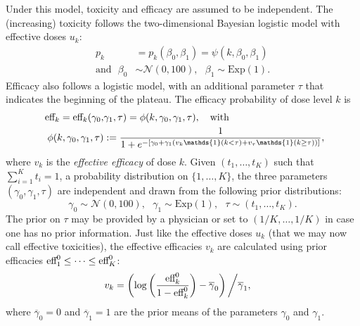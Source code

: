 Under this model, toxicity and efficacy are assumed to be independent. The (increasing) toxicity follows the two-dimensional Bayesian logistic model with effective doses $u_k$:  
\begin{align*}
p_k &= p_k(\beta_0,\beta_1) = \psi(k,\beta_0,\beta_1) 
\\
\text{and} \ \ \ \beta_0 &\sim \mathcal{N}(0,100), \ \ \ \beta_1 \sim \text{Exp}(1).
\end{align*}
Efficacy also follows a logistic model, with an additional parameter $\tau$ that indicates the beginning of the plateau. The efficacy probability of dose level $k$ is
\begin{align}\label{toxEff-model}
\eff_k = \eff_k(\gamma_0,&\gamma_1,\tau) = \phi(k,\gamma_0,\gamma_1,\tau), \ \ \
\text{with}
\\ \nonumber
	 \ \ \phi(k,\gamma_0,\gamma_1,\tau) &:= \frac{1}{1 + e^{-\left[\gamma_0 + \gamma_1(
    v_k \mathds{1}(k<\tau) + v_{\tau} \mathds{1}(k\ge\tau) )\right]}},
\end{align}
where $v_k$ is the \emph{effective efficacy} of dose $k$. Given $(t_1,\dots,t_K)$ such that $\sum_{i=1}^K t_i = 1$, a probability distribution on $\{1,\dots,K\}$, the three parameters $(\gamma_0,\gamma_1,\tau)$ are independent and drawn from the following prior distributions:     
\[\gamma_0 \sim \mathcal{N}(0,100), \ \ \ \gamma_1 \sim \text{Exp}(1), \ \ \  \tau  \sim (t_1,\dots,t_K).\]
The prior on $\tau$ may be provided by a physician or set to $(1/K,\dots,1/K)$ in case one has no prior information. Just like the effective doses $u_k$ (that we may now call effective toxicities), the effective efficacies $v_k$ are calculated using prior efficacies $\text{eff}^0_1 \leq \dots \leq \text{eff}^0_K$:
\begin{align*}
v_k &= \left( \log\left( \frac{ \text{eff}^0_k }{1 - \text{eff}^0_k} \right)
    - \overline{\gamma}_0 \right) \bigg/ \overline{\gamma}_1,
\end{align*}
where $\overline{\gamma}_0 = 0$ and $\overline{\gamma}_1 = 1$ are the prior means of the parameters $\gamma_0$ and $\gamma_1$. 

